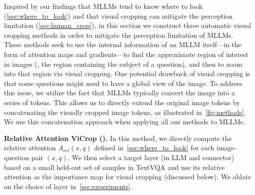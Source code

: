 Inspired by our findings that MLLMs tend to know where to look (\cref{sec:where_to_look}) and that visual cropping can mitigate the perception limitation (\cref{sec:human_crop}), in this section we construct three automatic visual cropping methods in order to mitigate the perception limitation of MLLMs. These methods seek to use the internal information of an MLLM itself---in the form of attention maps and gradients---to find the approximate region of interest in images (\ie, the region containing the subject of a question), and then to zoom into that region via visual cropping.
One potential drawback of visual cropping is that some questions might need to have a global view of the image. To address this issue, we utilize the fact that MLLMs typically convert the image into a series of tokens. This allows us to directly extend the original image tokens by concatenating the visually cropped image tokens, as illustrated in~\cref{fig:methods}. We use this concatenation approach when applying all our methods to MLLMs.

\textbf{Relative Attention ViCrop (\rel{}).} In this method, we directly compute the relative attention $A_{rel}(x,q)$ defined in~\cref{sec:where_to_look} for each image-question pair $(x,q)$. We then select a target layer (in LLM and connector) based on a small held-out set of samples in TextVQA and use its relative attention as the importance map for visual cropping (discussed below). We ablate on the choice of layer in~\cref{sec:experiments}.

